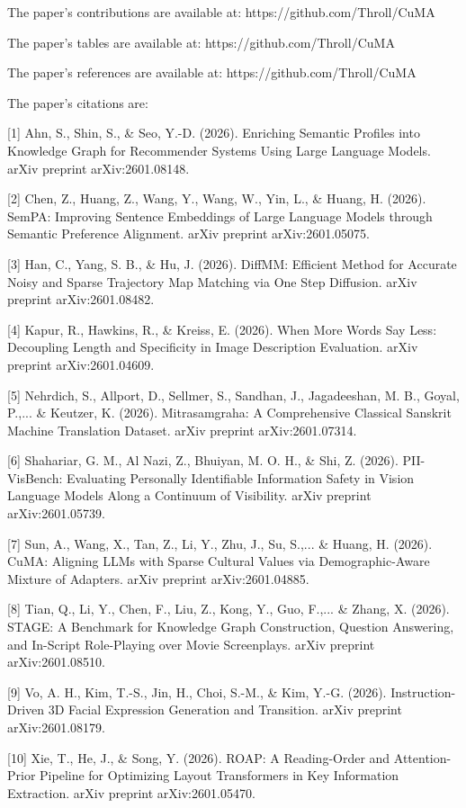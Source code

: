 The paper's contributions are available at: https://github.com/Throll/CuMA

The paper's tables are available at: https://github.com/Throll/CuMA

The paper's references are available at: https://github.com/Throll/CuMA

The paper's citations are:

[1] Ahn, S., Shin, S., & Seo, Y.-D. (2026). Enriching Semantic Profiles into Knowledge Graph for Recommender Systems Using Large Language Models. arXiv preprint arXiv:2601.08148.

[2] Chen, Z., Huang, Z., Wang, Y., Wang, W., Yin, L., & Huang, H. (2026). SemPA: Improving Sentence Embeddings of Large Language Models through Semantic Preference Alignment. arXiv preprint arXiv:2601.05075.

[3] Han, C., Yang, S. B., & Hu, J. (2026). DiffMM: Efficient Method for Accurate Noisy and Sparse Trajectory Map Matching via One Step Diffusion. arXiv preprint arXiv:2601.08482.

[4] Kapur, R., Hawkins, R., & Kreiss, E. (2026). When More Words Say Less: Decoupling Length and Specificity in Image Description Evaluation. arXiv preprint arXiv:2601.04609.

[5] Nehrdich, S., Allport, D., Sellmer, S., Sandhan, J., Jagadeeshan, M. B., Goyal, P.,... & Keutzer, K. (2026). Mitrasamgraha: A Comprehensive Classical Sanskrit Machine Translation Dataset. arXiv preprint arXiv:2601.07314.

[6] Shahariar, G. M., Al Nazi, Z., Bhuiyan, M. O. H., & Shi, Z. (2026). PII-VisBench: Evaluating Personally Identifiable Information Safety in Vision Language Models Along a Continuum of Visibility. arXiv preprint arXiv:2601.05739.

[7] Sun, A., Wang, X., Tan, Z., Li, Y., Zhu, J., Su, S.,... & Huang, H. (2026). CuMA: Aligning LLMs with Sparse Cultural Values via Demographic-Aware Mixture of Adapters. arXiv preprint arXiv:2601.04885.

[8] Tian, Q., Li, Y., Chen, F., Liu, Z., Kong, Y., Guo, F.,... & Zhang, X. (2026). STAGE: A Benchmark for Knowledge Graph Construction, Question Answering, and In-Script Role-Playing over Movie Screenplays. arXiv preprint arXiv:2601.08510.

[9] Vo, A. H., Kim, T.-S., Jin, H., Choi, S.-M., & Kim, Y.-G. (2026). Instruction-Driven 3D Facial Expression Generation and Transition. arXiv preprint arXiv:2601.08179.

[10] Xie, T., He, J., & Song, Y. (2026). ROAP: A Reading-Order and Attention-Prior Pipeline for Optimizing Layout Transformers in Key Information Extraction. arXiv preprint arXiv:2601.05470.

